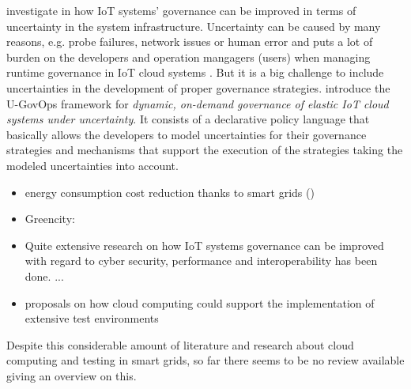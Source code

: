 \citeauthor{7396147} investigate in how IoT systems' governance can be improved in terms of uncertainty in the system infrastructure. Uncertainty can be caused by many reasons, e.g. probe failures, network issues or human error and puts a lot of burden on the developers and operation mangagers (users) when managing runtime governance in IoT cloud systems \cite{7396147}. But it is a big challenge to include uncertainties in the development of proper governance strategies. \citeauthor{7396147} introduce the U-GovOps framework for \textit{dynamic, on-demand governance of elastic IoT cloud systems under uncertainty}. It consists of a declarative policy language that basically allows the developers to model uncertainties for their governance strategies and mechanisms that support the execution of the strategies taking the modeled uncertainties into account.

\begin{itemize}
\item energy consumption cost reduction thanks to smart grids (\citeauthor{bornhoft2013simulation})
\item Greencity: \citeauthor{baumgartner2020monitoring}
\item Quite extensive research on how IoT systems governance can be improved with regard to cyber security, performance and interoperability has been done. ...
\item proposals on how cloud computing could support the implementation of extensive test environments
\end{itemize}

Despite this considerable amount of literature and research about cloud computing and testing in smart grids, so far there seems to be no review available giving an overview on this.
